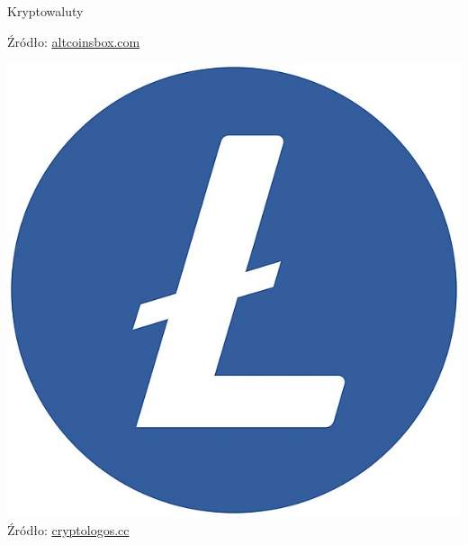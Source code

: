 \begin{frame}{Kryptowaluty}
\begin{center}
\begin{minipage}{0.24\textwidth}
            \tiny{Źródło: \href{https://altcoinsbox.com/dogecoin-logo/}{altcoinsbox.com}}
        \end{minipage}
        \hfill
        \begin{minipage}{0.24\textwidth}
            \centering
            \includegraphics[width=\linewidth]{applications/graphics/Litecoin.jpg} \\
            \tiny{Źródło: \href{https://cryptologos.cc/litecoin}{cryptologos.cc}}
        \end{minipage}
    \end{center}
\end{frame}



